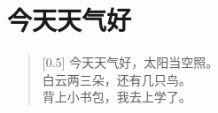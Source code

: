 \documentclass[12pt,UTF-8,openany]{ctexbook}
\begin{document}
\hanzibox{}\hanzibox{}\hanzibox{}\hanzibox{}\hspace{1em}\hanzibox{}\hanzibox{}\hanzibox{}\hanzibox{}

\hanzibox{}\hanzibox{}\hanzibox{}\hanzibox{}\hspace{1em}\hanzibox{}\hanzibox{}\hanzibox{}\hanzibox{}






\chapter{今天天气好}

\begin{large}
    
    \begin{verse}[0.5\linewidth]
        今天天气好，太阳当空照。 \\
        白云两三朵，还有几只鸟。 \\
        背上小书包，我去上学了。
    \end{verse}
    
\end{large}


\clearpage

\begin{center}
    
    
\end{center}


\hanzibox{}\hanzibox{}\hanzibox{}\hanzibox{}\hspace{1em}\hanzibox{}\hanzibox{}\hanzibox{}\hanzibox{}

\hanzibox{}\hanzibox{}\hanzibox{}\hanzibox{}\hspace{1em}\hanzibox{}\hanzibox{}\hanzibox{}\hanzibox{}

\hanzibox{}\hanzibox{}\hanzibox{}\hanzibox{}\hspace{1em}\hanzibox{}\hanzibox{}\hanzibox{}\hanzibox{}

\hanzibox{}\hanzibox{}\hanzibox{}\hanzibox{}\hspace{1em}\hanzibox{}\hanzibox{}\hanzibox{}\hanzibox{}
\end{document}
